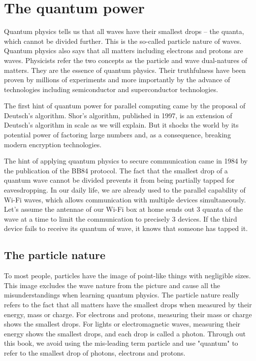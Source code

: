 \documentclass{book}
\begin{document}
\section{The quantum power}
Quantum physics tells us that all waves have their smallest drops -- the quanta, which cannot be divided further. This is the so-called particle nature of waves. Quantum physics also says that all matters including electrons and protons are waves. Physicists refer the two concepts as the particle and wave dual-natures of matters. They are the essence of quantum physics. Their truthfulness have been proven by millions of experiments and more importantly by the advance of technologies including semiconductor and superconductor technologies.

The first hint of quantum power for parallel computing came by the proposal of Deutsch's algorithm\cite{1985Deutsch}. Shor's algorithm, published in 1997, is an extension of Deutsch's algorithm in scale as we will explain. But it shocks the world by its potential power of factoring large numbers and, as a consequence, breaking modern encryption technologies.

The hint of applying quantum physics to secure communication came in 1984 by the publication of the BB84 protocol\cite{BB84}. The fact that the smallest drop of a quantum wave cannot be divided prevents it from being partially tapped for eavesdropping. In our daily life, we are already used to the parallel capability of Wi-Fi waves, which allows communication with multiple devices simultaneously. Let's assume the antennae of our Wi-Fi box at home sends out 3 quanta of the wave at a time to limit the communication to precisely 3 devices. If the third device fails to receive its quantum of wave, it knows that someone has tapped it.

\subsection{The particle nature}
To most people, particles have the image of point-like things with negligible sizes. This image excludes the wave nature from the picture and cause all the misunderstandings when learning quantum physics. The particle nature really refers to the fact that all matters have the smallest drops when measured by their energy, mass or charge. For electrons and protons, measuring their mass or charge shows the smallest drops. For lights or electromagnetic waves, measuring their energy shows the smallest drops, and each drop is called a photon. Through out this book, we avoid using the mis-leading term particle and use "quantum" to refer to the smallest drop of photons, electrons and protons.
\end{document}
